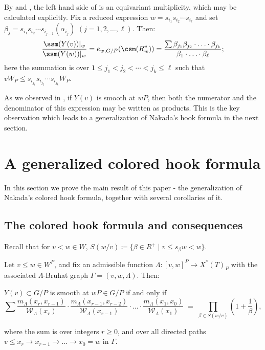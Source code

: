 \begin{remark} By  and , the left hand side of  
is an equivariant multiplicity, which may be calculated explicitly. Fix a reduced expression $w=s_{i_1} s_{i_2} \cdots s_{i_\ell}$
and set $\beta_j=s_{i_1} s_{i_2} \cdots s_{i_{j-1}}(\alpha_{i_j})$
$(j=1,2,\ldots,\ell)$. Then:
\begin{equation}\label{equ:explicit} \frac{\ssm(Y(v))|_w}{\ssm(Y(w))|_w} = 
e_{w,G/P}(\csm(R_w^v)) =\frac{\sum \beta_{j_1}\beta_{j_2}\cdot \ldots \cdot \beta_{j_k}}{\beta_1\cdot \ldots \cdot \beta_\ell} \/;
\end{equation}
here 
the summation is over $ 1\leq j_1<j_2<\cdots <j_k\leq \ell$ such that 
$vW_P\leq s_{i_{j_1}}s_{i_{j_2}}\cdots s_{i_{j_k}}W_P$.

As we observed in , if $Y(v)$ is smooth at $wP$, then 
both the numerator and the denominator of this expression may be written as products.
This is the key observation which leads to a generalization of Nakada's hook formula in the next section.\end{remark}


\section{A generalized colored hook formula}\label{sec:genhook}
In this section we prove the main result of this paper - 
the generalization of Nakada's colored hook formula, together with several corollaries 
of it.
\subsection{The colored hook formula and consequences}\label{sec:col-and-conseq}
Recall that for $v < w \in W$, $S(w/v)\coloneqq \{\beta\in R^+\mid v\le s_\beta w<w\}$.
\begin{theorem}\label{thm:genNak} Let $v\leq  w\in W^P$, and fix an admissible 
	function $\Lambda:[v,w]^P\to X^{*}(T)_P$ with the associated 
	$\Lambda$-Bruhat graph $\Gamma=(v,w,\Lambda)$. Then: 
	\begin{center}
		$Y(v)\subset G/P$ is smooth at $wP\in G/P$  if and only if
		\[
		\sum\frac{m_\Lambda(x_r,x_{r-1})}{\mathcal{W}_\Lambda(x_r)}\cdot \frac{m_\Lambda(x_{r-1},x_{r-2})}{\mathcal{W}_\Lambda(x_{r-1})}\cdot \ldots \cdot \frac{m_\Lambda(x_{1},x_{0})}{\mathcal{W}_\Lambda(x_{1})}
		\;=\;
		\prod_{\beta \in S(w/v)} \left(1+\frac{1}{\beta}\right),\]
	\end{center}
	where the sum is over integers $r \ge 0$, and over all directed paths 
	$v\leq x_r \overset{}{\to} x_{r-1} \overset{}{\to} \ldots \overset{}{\to} x_0 = w$ in $\Gamma$.
\end{theorem}

